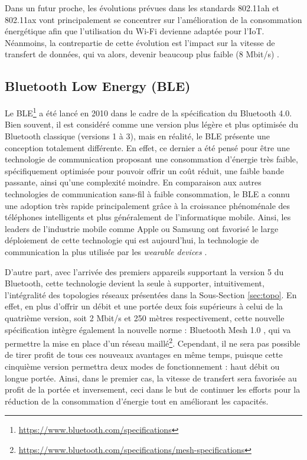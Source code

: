 Dans un futur proche, les évolutions prévues dans les standards 802.11ah et 802.11ax vont principalement se concentrer sur l'amélioration de la consommation énergétique afin que l'utilisation du Wi-Fi devienne adaptée pour l'\acs{IoT}. Néanmoins, la contrepartie de cette évolution est l'impact sur la vitesse de transfert de données, qui va alors, devenir beaucoup plus faible (8 Mbit/s) \citep{Sun2013}.

\subsection{Bluetooth Low Energy (\acs{BLE})}
\label{subec:com_ble}

Le \acs{BLE}\footnote{\url{https://www.bluetooth.com/specifications}} a été lancé en 2010 dans le cadre de la spécification du Bluetooth 4.0. Bien souvent, il est considéré comme une version plus légère et plus optimisée du Bluetooth classique (versions 1 à 3), mais en réalité, le \acs{BLE} présente une conception totalement différente. En effet, ce dernier a été pensé pour être une technologie de communication proposant une consommation d'énergie très faible, spécifiquement optimisée pour pouvoir offrir un coût réduit, une faible bande passante, ainsi qu'une complexité moindre. En comparaison aux autres technologies de communication sans-fil à faible consommation, le \acs{BLE} a connu une adoption très rapide principalement grâce à la croissance phénoménale des téléphones intelligents et plus généralement de l'informatique mobile. Ainsi, les leaders de l'industrie mobile comme Apple ou Samsung ont favorisé le large déploiement de cette technologie qui est aujourd'hui, la technologie de communication la plus utilisée par les \textit{wearable devices} \citep{Gomez2012}.

D'autre part, avec l'arrivée des premiers appareils supportant la version 5 du Bluetooth, cette technologie devient la seule à supporter, intuitivement, l'intégralité des topologies réseaux présentées dans la Sous-Section \ref{sec:topo}. En effet, en plus d'offrir un débit et une portée deux fois supérieurs à celui de la quatrième version, soit 2 Mbit/s et 250 mètres respectivement, cette nouvelle spécification intègre également la nouvelle norme : \og Bluetooth Mesh 1.0 \fg, qui va permettre la mise en place d'un réseau maillé\footnote{\url{https://www.bluetooth.com/specifications/mesh-specifications}}. Cependant, il ne sera pas possible de tirer profit de tous ces nouveaux avantages en même temps, puisque cette cinquième version permettra deux modes de fonctionnement : haut débit ou longue portée. Ainsi, dans le premier cas, la vitesse de transfert sera favorisée au profit de la portée et inversement, ceci dans le but de continuer les efforts pour la réduction de la consommation d'énergie tout en améliorant les capacités.

